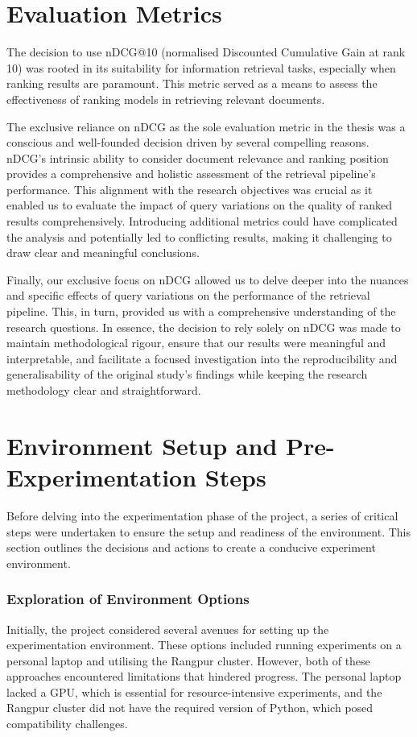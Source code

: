 \section{Evaluation Metrics}
The decision to use nDCG@10 (normalised Discounted Cumulative Gain at rank 10) was rooted in its suitability for information retrieval tasks, especially when ranking results are paramount. This metric served as a means to assess the effectiveness of ranking models in retrieving relevant documents.

The exclusive reliance on nDCG as the sole evaluation metric in the thesis was a conscious and well-founded decision driven by several compelling reasons. nDCG's intrinsic ability to consider document relevance and ranking position provides a comprehensive and holistic assessment of the retrieval pipeline's performance. This alignment with the research objectives was crucial as it enabled us to evaluate the impact of query variations on the quality of ranked results comprehensively. Introducing additional metrics could have complicated the analysis and potentially led to conflicting results, making it challenging to draw clear and meaningful conclusions.

Finally, our exclusive focus on nDCG allowed us to delve deeper into the nuances and specific effects of query variations on the performance of the retrieval pipeline. This, in turn, provided us with a comprehensive understanding of the research questions. In essence, the decision to rely solely on nDCG was made to maintain methodological rigour, ensure that our results were meaningful and interpretable, and facilitate a focused investigation into the reproducibility and generalisability of the original study's findings while keeping the research methodology clear and straightforward.

\section{Environment Setup and Pre-Experimentation Steps}
Before delving into the experimentation phase of the project, a series of critical steps were undertaken to ensure the setup and readiness of the environment. This section outlines the decisions and actions to create a conducive experiment environment.

\subsubsection{Exploration of Environment Options}
Initially, the project considered several avenues for setting up the experimentation environment. These options included running experiments on a personal laptop and utilising the Rangpur cluster. However, both of these approaches encountered limitations that hindered progress. The personal laptop lacked a GPU, which is essential for resource-intensive experiments, and the Rangpur cluster did not have the required version of Python, which posed compatibility challenges.

